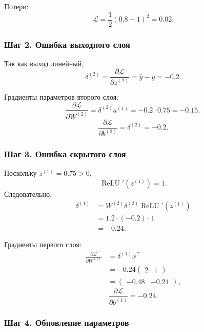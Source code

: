 \documentclass[12pt,a4paper]{article}
\theoremstyle{plain}
\theoremstyle{definition}
\theoremstyle{remark}
\begin{document}
Потери:
\[
    \mathcal{L}
    =
    \frac{1}{2}(0.8-1)^2
    =
    0.02.
\]

\subsubsection*{Шаг 2. Ошибка выходного слоя}

Так как выход линейный,
\[
    \delta^{(2)}
    =
    \frac{\partial\mathcal{L}}
    {\partial z^{(2)}}
    =
    \widehat{y}-y
    =
    -0.2.
\]

Градиенты параметров второго слоя:
\[
    \frac{\partial\mathcal{L}}{\partial W^{(2)}}
    =
    \delta^{(2)}a^{(1)}
    =
    -0.2\cdot 0.75
    =
    -0.15,
\]
\[
    \frac{\partial\mathcal{L}}{\partial b^{(2)}}
    =
    \delta^{(2)}
    =
    -0.2.
\]

\subsubsection*{Шаг 3. Ошибка скрытого слоя}

Поскольку $z^{(1)}=0.75>0$,
\[
    \operatorname{ReLU}'(z^{(1)})=1.
\]
Следовательно,
\[
\begin{aligned}
    \delta^{(1)}
    &=
    W^{(2)}\delta^{(2)}
    \operatorname{ReLU}'(z^{(1)})\\
    &=
    1.2\cdot(-0.2)\cdot 1\\
    &=
    -0.24.
\end{aligned}
\]

Градиенты первого слоя:
\[
\begin{aligned}
    \frac{\partial\mathcal{L}}{\partial W^{(1)}}
    &=
    \delta^{(1)}x^\top\\
    &=
    -0.24
    \begin{pmatrix}
        2&1
    \end{pmatrix}\\
    &=
    \begin{pmatrix}
        -0.48&-0.24
    \end{pmatrix},
\end{aligned}
\]
\[
    \frac{\partial\mathcal{L}}{\partial b^{(1)}}
    =
    -0.24.
\]

\subsubsection*{Шаг 4. Обновление параметров}
\end{document}
